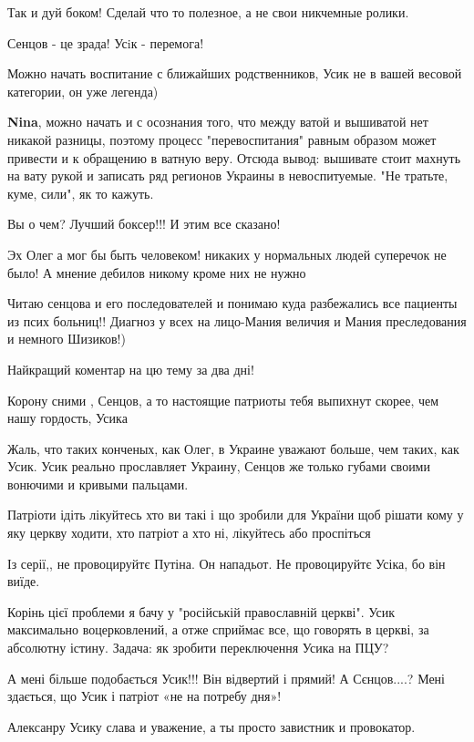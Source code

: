 \begin{itemize}
Так и дуй боком! Сделай что то полезное, а не свои никчемные ролики.

Сенцов - це зрада!
Усiк - перемога!

Можно начать воспитание с ближайших родственников, Усик не в вашей весовой категории, он уже легенда)

\begin{itemize} %
\textbf{Nina}, можно начать и с осознания того, что между ватой и вышиватой нет никакой разницы, поэтому процесс "перевоспитания" равным образом может привести и к обращению в ватную веру.
Отсюда вывод: вышивате стоит махнуть на вату рукой и записать ряд регионов Украины в невоспитуемые. "Не тратьте, куме, сили", як то кажуть.
\end{itemize} %

Вы о чем? Лучший боксер!!! И этим все сказано!

Эх Олег а мог бы быть человеком! никаких у нормальных людей суперечок не было! А мнение дебилов никому кроме них не нужно


Читаю сенцова и его последователей и понимаю куда разбежались все пациенты из
псих больниц!! Диагноз у всех на лицо-Мания величия и Мания преследования и
немного Шизиков!)


Найкращий коментар на цю тему за два дні!

Корону сними , Сенцов, а то настоящие патриоты тебя выпихнут скорее, чем нашу гордость, Усика


Жаль, что таких конченых, как Олег, в Украине уважают больше, чем таких, как
Усик. Усик реально прославляет Украину, Сенцов же только губами своими вонючими
и кривыми пальцами.



Патріоти ідіть лікуйтесь хто ви такі і що зробили для України щоб рішати кому у
яку церкву ходити, хто патріот а хто ні, лікуйтесь або проспіться


Із серії,, не провоцируйтє Путіна. Он нападьот. Не провоцируйтє Усіка, бо він виїде.

Корінь цієї проблеми я бачу у "російській православній церкві".
Усик максимально воцерковлений, а отже сприймає все, що говорять в церкві, за абсолютну істину.
Задача: як зробити переключення Усика на ПЦУ?

А мені більше подобається Усик!!! Він відвертий і прямий! А Сєнцов....? Мені здається, що Усик і патріот
«не на потребу дня»!

Алексанру Усику слава и уважение, а ты просто завистник и провокатор.

\end{itemize} %

